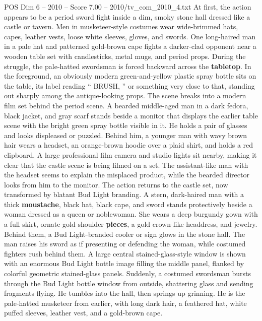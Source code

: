 \begin{textsample}{POS Dim 6 – 2010 – Score 7.00 – 2010/tv\_com\_2010\_4.txt}  \label{ex:f6_pos_085}
At first, the action appears to be a period sword fight inside a dim, smoky stone hall dressed like a castle or tavern.
Men in musketeer-style costumes wear wide-brimmed hats, capes, leather vests, loose white sleeves, gloves, and swords.
One long-haired man in a pale hat and patterned gold-brown cape fights a darker-clad opponent near a wooden table set with candlesticks, metal mugs, and period props.
During the struggle, the pale-hatted swordsman is forced backward across the \textbf{tabletop}.
In the foreground, an obviously modern green-and-yellow plastic spray bottle sits on the table, its label reading “ BRUSH, ” or something very close to that, standing out sharply among the antique-looking props.
The scene breaks into a modern film set behind the period scene.
A bearded middle-aged man in a dark fedora, black jacket, and gray scarf stands beside a monitor that displays the earlier table scene with the bright green spray bottle visible in it.
He holds a pair of glasses and looks displeased or puzzled.
Behind him, a younger man with wavy brown hair wears a headset, an orange-brown hoodie over a plaid shirt, and holds a red clipboard.
A large professional film camera and studio lights sit nearby, making it clear that the castle scene is being filmed on a set.
The assistant-like man with the headset seems to explain the misplaced product, while the bearded director looks from him to the monitor.
The action returns to the castle set, now transformed by blatant Bud Light branding.
A stern, dark-haired man with a thick \textbf{moustache}, black hat, black cape, and sword stands protectively beside a woman dressed as a queen or noblewoman.
She wears a deep burgundy gown with a full skirt, ornate gold shoulder \textbf{pieces}, a gold crown-like headdress, and jewelry.
Behind them, a Bud Light-branded cooler or sign glows in the stone hall.
The man raises his sword as if presenting or defending the woman, while costumed fighters rush behind them.
A large central stained-glass-style window is shown with an enormous Bud Light bottle image filling the middle panel, flanked by colorful geometric stained-glass panels.
Suddenly, a costumed swordsman bursts through the Bud Light bottle window from outside, shattering glass and sending fragments flying.
He tumbles into the hall, then springs up grinning.
He is the pale-hatted musketeer from earlier, with long dark hair, a feathered hat, white puffed sleeves, leather vest, and a gold-brown cape.

\end{textsample}
